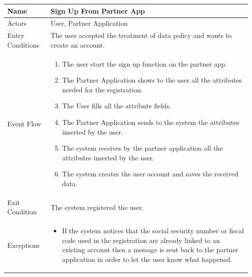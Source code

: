 \begin{enumerate}
\FloatBarrier
\begin{table}[h]
\begin{tabular}{|l|p{}|}
\hline
Name             & Sign Up From Partner App\\ \hline
Actors           & User, Partner Application  \\ \hline
Entry Conditions & The user accepted the treatment of data policy and wants to create an account.  \\ \hline
Event Flow       & \begin{enumerate}
			\item The user start the sign up function on the partner app.
			\item The Partner Application shows to the user all the attributes needed for the registration.
            \item The User fills all the attribute fields.
            \item The Partner Application sends to the system the attributes inserted by the user.
            \item The system receives by the partner application all the attributes inserted by the user.
            \item The system creates the user account and saves the received data.
        \end{enumerate}\\ \hline
Exit Condition   & The system registered the user.\\ \hline
Exceptions       & \begin{itemize}
\item If the system notices that the social security number or fiscal code used in the registration are already linked to an existing account then a message is sent back to the partner application in order to let the user know what happened.
\end{itemize}\\ \hline
\end{tabular}
\end{table}
\FloatBarrier


\end{enumerate}
